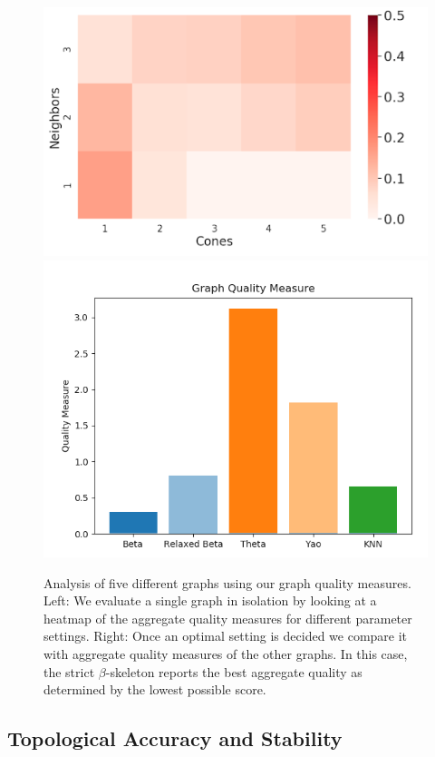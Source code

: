 \begin{figure}
    \includegraphics[width=0.48\linewidth]{figs/chap7/yao_heatmap_2.png}
    \includegraphics[width=0.48\linewidth]{figs/chap7/optimal_quality_measures.png}
    \caption{Analysis of five different graphs using our graph quality measures.
    Left: We evaluate a single graph in isolation by looking at a heatmap of the aggregate quality measures for different parameter settings.
    Right: Once an optimal setting is decided we compare it with aggregate quality measures of the other graphs.
    In this case, the strict $\beta$-skeleton reports the best aggregate quality as determined by the lowest possible score.}
    \label{fig:graph_svm}
\end{figure}

\subsection{Topological Accuracy and Stability}


